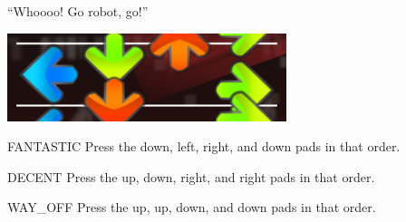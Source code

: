 ``Whoooo! Go robot, go!''

\begin{center}
  \includegraphics{itg-dlrd.png}
\end{center}

\begin{switch}
\item{FANTASTIC}
  Press the down, left, right, and down pads in that order.
\item{DECENT}
  Press the up, down, right, and right pads in that order.
\item{WAY\_OFF}
  Press the up, up, down, and down pads in that order.
\end{switch}


